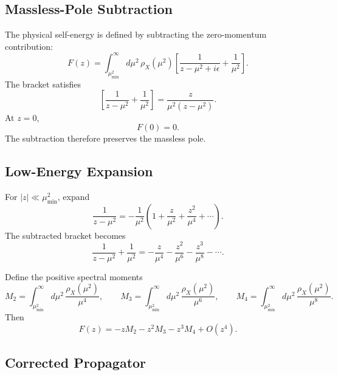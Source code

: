\documentclass[11pt]{article}
\begin{document}
\subsection{Massless-Pole Subtraction}

The physical self-energy is defined by subtracting the zero-momentum contribution:
\begin{equation}
\boxed{
F(z)
=
\int_{\mu_{\min}^2}^{\infty}
d\mu^2\,
\rho_X(\mu^2)
\left[
\frac{1}{z-\mu^2+i\epsilon}
+
\frac{1}{\mu^2}
\right].
}
\end{equation}
The bracket satisfies
\begin{equation}
\boxed{
\left[
\frac{1}{z-\mu^2}
+
\frac{1}{\mu^2}
\right]
=
\frac{z}{\mu^2(z-\mu^2)}.
}
\end{equation}
At \(z=0\),
\begin{equation}
\boxed{
F(0)=0.
}
\end{equation}
The subtraction therefore preserves the massless pole.

\subsection{Low-Energy Expansion}

For \(|z|\ll\mu_{\min}^2\), expand
\begin{equation}
\frac{1}{z-\mu^2}
=
-\frac{1}{\mu^2}
\left(
1+\frac{z}{\mu^2}
+
\frac{z^2}{\mu^4}
+
\cdots
\right).
\end{equation}
The subtracted bracket becomes
\begin{equation}
\frac{1}{z-\mu^2}
+
\frac{1}{\mu^2}
=
-\frac{z}{\mu^4}
-\frac{z^2}{\mu^6}
-\frac{z^3}{\mu^8}
-\cdots .
\end{equation}

Define the positive spectral moments
\begin{equation}
\boxed{
M_2
=
\int_{\mu_{\min}^2}^{\infty}
d\mu^2\,
\frac{\rho_X(\mu^2)}{\mu^4},
\qquad
M_3
=
\int_{\mu_{\min}^2}^{\infty}
d\mu^2\,
\frac{\rho_X(\mu^2)}{\mu^6},
\qquad
M_4
=
\int_{\mu_{\min}^2}^{\infty}
d\mu^2\,
\frac{\rho_X(\mu^2)}{\mu^8}.
}
\end{equation}
Then
\begin{equation}
\boxed{
F(z)
=
-zM_2
-z^2M_3
-z^3M_4
+O(z^4).
}
\end{equation}

\subsection{Corrected Propagator}
\end{document}
